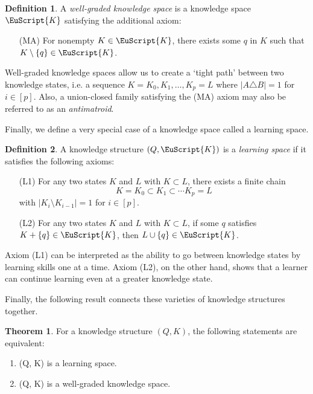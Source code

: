 \documentclass[11pt,letterpaper,dvipsnames]{article}
\theoremstyle{definition}
\newtheorem{definition}{Definition}[section]
\newtheorem{theorem}{Theorem}[section]
\newcommand{\es}[1]{\EuScript{#1}}
\begin{document}
\begin{definition}
A \textit{well-graded knowledge space} is a knowledge space $\es{K}$ satisfying the additional axiom:
\begin{enumerate}
    \item[(MA)] For nonempty $K\in \es{K}$, there exists some $q$ in $K$ such that $K \setminus \{q\}\in \es{K}$.
\end{enumerate}
\end{definition}

Well-graded knowledge spaces allow us to create a `tight path' between two knowledge states, i.e. a sequence $K=K_0,K_1,\dots,K_p=L$ where $|A\triangle B|=1$ for $i\in[p]$. Also, a union-closed family satisfying the (MA) axiom may also be referred to as an \textit{antimatroid}.

Finally, we define a very special case of a knowledge space called a learning space.

\begin{definition}
    A knowledge structure $(Q, \es{K})$ is a \textit{learning space} if it satisfies the following axioms:
    \begin{enumerate}
        \item[(L1)] For any two states $K$ and $L$ with $K\subset L$, there exists a finite chain
        \[
            K=K_0\subset K_1\subset \cdots K_p=L
        \]
        with $|K_i\setminus K_{i-1}|=1$ for $i\in [p]$.
        \item[(L2)] For any two states $K$ and $L$ with $K\subset L$, if some $q$ satisfies $K+\{q\}\in \es{K}$, then $L\cup \{q\}\in \es{K}$.
    \end{enumerate}
\end{definition}

Axiom (L1) can be interpreted as the ability to go between knowledge states by learning skills one at a time. Axiom (L2), on the other hand, shows that a learner can continue learning even at a greater knowledge state.

Finally, the following result connects these varieties of knowledge structures together.

\begin{theorem}
    For a knowledge structure $(Q,K)$, the following statements are equivalent:
    \begin{enumerate}
        \item (Q, K) is a learning space. 
        \item (Q, K) is a well-graded knowledge space.
    \end{enumerate}
\end{theorem}
\end{document}
